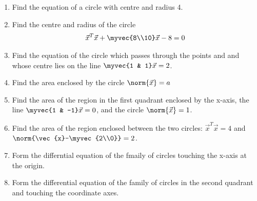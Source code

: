 \renewcommand{\theequation}{\theenumi}
\begin{enumerate}[label=\arabic*.,ref=\thesubsection.\theenumi]
\item Find the equation of a circle with centre  and radius 4.
\item Find the centre and radius of the circle
\begin{align}
\vec{x}^T\vec{x}+\myvec{8\\10}\vec{x} -8= 0
\end{align}
%
\item Find the equation of the circle which passes through the points  and  and whose centre lies on the line $\myvec{1 & 1} \vec{x} = 2$.
\item Find the area enclosed by the circle $\norm{\vec{x}} = a$
%
\item Find the area of the region in the first quadrant enclosed by the x-axis, the line $\myvec{1 & -1}\vec{x} = 0$, and the circle $\norm{\vec{x}} = 1$.
%
\item Find the area of the region enclosed between the two circles: $\vec{x}^T\vec{x} = 4$ and $\norm{\vec{x}-\myvec{2\\0}} = 2$.
%
\item Form the differntial equation of the fmaily of circles touching the x-axis at the origin.
%
\item Form the differential equation of the family of circles in the second quadrant and touching the coordinate axes.
\end{enumerate}
